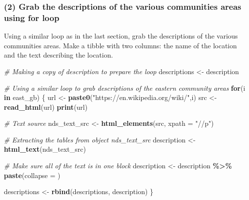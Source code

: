 \documentclass[
]{article}
\newenvironment{Shaded}{\begin{snugshade}}{\end{snugshade}}
\newcommand{\AttributeTok}[1]{\textcolor[rgb]{0.13,0.29,0.53}{#1}}
\newcommand{\CommentTok}[1]{\textcolor[rgb]{0.56,0.35,0.01}{\textit{#1}}}
\newcommand{\ControlFlowTok}[1]{\textcolor[rgb]{0.13,0.29,0.53}{\textbf{#1}}}
\newcommand{\FunctionTok}[1]{\textcolor[rgb]{0.13,0.29,0.53}{\textbf{#1}}}
\newcommand{\NormalTok}[1]{#1}
\newcommand{\OtherTok}[1]{\textcolor[rgb]{0.56,0.35,0.01}{#1}}
\newcommand{\SpecialCharTok}[1]{\textcolor[rgb]{0.81,0.36,0.00}{\textbf{#1}}}
\newcommand{\StringTok}[1]{\textcolor[rgb]{0.31,0.60,0.02}{#1}}
\begin{document}
\hypertarget{grab-the-descriptions-of-the-various-communities-areas-using-for-loop}{%
\subsubsection{(2) Grab the descriptions of the various communities
areas using for
loop}\label{grab-the-descriptions-of-the-various-communities-areas-using-for-loop}}

Using a similar loop as in the last section, grab the descriptions of
the various communities areas. Make a tibble with two columns: the name
of the location and the text describing the location.

\begin{Shaded}
\begin{Highlighting}[]
\CommentTok{\# Making a copy of description to prepare the loop}
\NormalTok{descriptions }\OtherTok{\textless{}{-}}\NormalTok{ description}
\end{Highlighting}
\end{Shaded}

\begin{Shaded}
\begin{Highlighting}[]
\CommentTok{\# Using a similar loop to grab descriptions of the eastern community areas}
\ControlFlowTok{for}\NormalTok{(i }\ControlFlowTok{in}\NormalTok{ east\_gb) \{}
\NormalTok{   url }\OtherTok{\textless{}{-}} \FunctionTok{paste0}\NormalTok{(}\StringTok{"https://en.wikipedia.org/wiki/"}\NormalTok{,i)}
\NormalTok{   src }\OtherTok{\textless{}{-}} \FunctionTok{read\_html}\NormalTok{(url)}
  \FunctionTok{print}\NormalTok{(url)   }

 \CommentTok{\# Text source}
\NormalTok{  nds\_text\_src }\OtherTok{\textless{}{-}} \FunctionTok{html\_elements}\NormalTok{(src, }\AttributeTok{xpath =} \StringTok{"//p"}\NormalTok{)}

\CommentTok{\# Extracting the tables from object nds\_text\_src }
\NormalTok{description }\OtherTok{\textless{}{-}} \FunctionTok{html\_text}\NormalTok{(nds\_text\_src)}

\CommentTok{\# Make sure all of the text is in one block}
\NormalTok{description }\OtherTok{\textless{}{-}}\NormalTok{ description }\SpecialCharTok{\%\textgreater{}\%} \FunctionTok{paste}\NormalTok{(}\AttributeTok{collapse =} \StringTok{\textquotesingle{} \textquotesingle{}}\NormalTok{)}

\NormalTok{descriptions }\OtherTok{\textless{}{-}} \FunctionTok{rbind}\NormalTok{(descriptions, description)}
\NormalTok{\}}
\end{Highlighting}
\end{Shaded}
\end{document}
